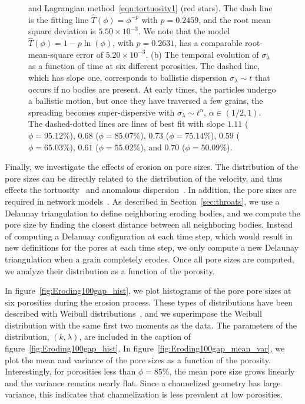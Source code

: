 \documentclass{jfm}
\begin{document}
\begin{figure}
{and Lagrangian method~\eqref{eqn:tortuosity1} (red stars).  The dash
line is the fitting line $\widehat{T}(\phi)=\phi^{-p}$ with $p=0.2459$,
and the root mean square deviation is $5.50 \times 10^{-3}$.  We note
that the model $\widehat{T}(\phi) = 1 - p \ln (\phi)$, with $p=0.2631$,
has a comparable root-mean-square error of $5.20 \times 10^{-3}$.  (b)
The temporal evolution of $\sigma_\lambda$ as a function of time at six
different porosities.  The dashed line, which has slope one, corresponds
to ballistic dispersion $\sigma_\lambda \sim t$ that occurs if no bodies
are present.  At early times, the particles undergo a ballistic motion,
but once they have traversed a few grains, the spreading becomes
super-dispersive with $\sigma_\lambda \sim t^{\alpha}$, $\alpha \in
(1/2,1)$.  The dashed-dotted lines are lines of best fit with slope
$1.11$ ($\phi=95.12\%$), $0.68$ ($\phi=85.07\%$), $0.73$
($\phi=75.14\%$), $0.59$ ($\phi=65.03\%$), $0.61$ ($\phi=55.02\%$), and
$0.70$ ($\phi=50.09\%$).}
\end{figure}

Finally, we investigate the effects of erosion on pore sizes.  The
distribution of the pore sizes can be directly related to the
distribution of the velocity, and thus effects the
tortuosity~\citep{den-ica-hid2018} and anomalous
dispersion~\citep{dea-qua-bir-jua2018}. In addition, the pore sizes are
required in network models~\citep{bry-mel-cad1993, bry-kin-mel1993}.  As
described in Section~\ref{sec:throats}, we use a Delaunay triangulation
to define neighboring eroding bodies, and we compute the pore size by
finding the closest distance between all neighboring bodies.  Instead of
computing a Delanuay configuration at each time step, which would result
in new definitions for the pores at each time step, we only compute a
new Delaunay triangulation when a grain completely erodes.  Once all
pore sizes are computed, we analyze their distribution as a function of
the porosity.  

In figure~\ref{fig:Eroding100gap_hist}, we plot histograms of the pore
pore sizes at six porosities during the erosion process. These types of
distributions have been described with Weibull
distributions~\citep{ioa-cha1993}, and we superimpose the Weibull
distribution with the same first two moments as the data.  The
parameters of the distribution, $(k,\lambda)$, are included in the
caption of figure~\ref{fig:Eroding100gap_hist}.  In
figure~\ref{fig:Eroding100gap_mean_var}, we plot the mean and variance
of the pore sizes as a function of the porosity.  Interestingly, for
porosities less than $\phi = 85\%$, the mean pore size grows linearly
and the variance remains nearly flat. Since a channelized geometry has
large variance, this indicates that channelization is less prevalent at
low porosities.
\end{document}
